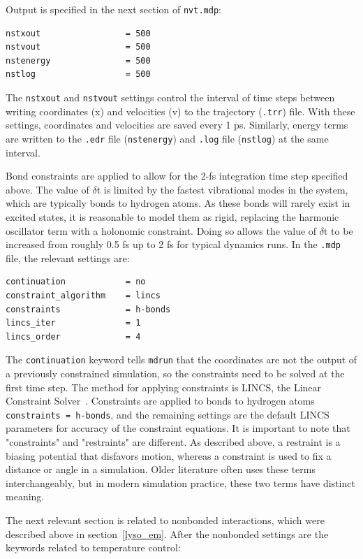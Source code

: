 \documentclass[9pt,tutorial,pubversion]{livecoms}
\begin{document}
Output is specified in the next section of \texttt{nvt.mdp}:

\begin{lstlisting}
nstxout                 = 500
nstvout                 = 500
nstenergy               = 500
nstlog                  = 500
\end{lstlisting}

The \texttt{nstxout} and \texttt{nstvout} settings control the interval of time steps between writing coordinates (x) and velocities (v) to the trajectory (\texttt{.trr}) file. With these settings, coordinates and velocities are saved every 1 ps. Similarly, energy terms are written to the \texttt{.edr} file (\texttt{nstenergy}) and \texttt{.log} file (\texttt{nstlog}) at the same interval.

Bond constraints are applied to allow for the 2-fs integration time step specified above. The value of $\delta$t is limited by the fastest vibrational modes in the system, which are typically bonds to hydrogen atoms. As these bonds will rarely exist in excited states, it is reasonable to model them as rigid, replacing the harmonic oscillator term with a holonomic constraint. Doing so allows the value of $\delta$t to be increased from roughly 0.5 fs up to 2 fs for typical dynamics runs. In the \texttt{.mdp} file, the relevant settings are:

\begin{lstlisting}
continuation            = no
constraint_algorithm    = lincs
constraints             = h-bonds
lincs_iter              = 1
lincs_order             = 4
\end{lstlisting}

The \texttt{continuation} keyword tells \texttt{mdrun} that the coordinates are not the output of a previously constrained simulation, so the constraints need to be solved at the first time step. The method for applying constraints is LINCS, the Linear Constraint Solver~\cite{Hess1997,Hess2008b}. Constraints are applied to bonds to hydrogen atoms \texttt{constraints = h-bonds}, and the remaining settings are the default LINCS parameters for accuracy of the constraint equations. It is important to note that "constraints" and "restraints" are different. As described above, a restraint is a biasing potential that disfavors motion, whereas a constraint is used to fix a distance or angle in a simulation. Older literature often uses these terms interchangeably, but in modern simulation practice, these two terms have distinct meaning.

The next relevant section is related to nonbonded interactions, which were described above in section~\ref{lyso_em}. After the nonbonded settings are the keywords related to temperature control:
\end{document}
